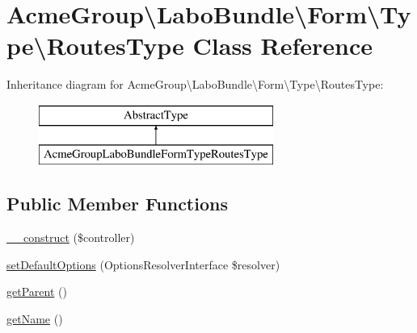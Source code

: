 \hypertarget{class_acme_group_1_1_labo_bundle_1_1_form_1_1_type_1_1_routes_type}{\section{Acme\+Group\textbackslash{}Labo\+Bundle\textbackslash{}Form\textbackslash{}Type\textbackslash{}Routes\+Type Class Reference}
\label{class_acme_group_1_1_labo_bundle_1_1_form_1_1_type_1_1_routes_type}
}
Inheritance diagram for Acme\+Group\textbackslash{}Labo\+Bundle\textbackslash{}Form\textbackslash{}Type\textbackslash{}Routes\+Type\+:\begin{figure}[H]
\begin{center}
\leavevmode
\includegraphics[height=2.000000cm]{class_acme_group_1_1_labo_bundle_1_1_form_1_1_type_1_1_routes_type}
\end{center}
\end{figure}
\subsection*{Public Member Functions}
\begin{DoxyCompactItemize}
\item 
\hyperlink{class_acme_group_1_1_labo_bundle_1_1_form_1_1_type_1_1_routes_type_a905761e58a698ebc680064c8cece0271}{\+\_\+\+\_\+construct} (\$controller)
\item 
\hyperlink{class_acme_group_1_1_labo_bundle_1_1_form_1_1_type_1_1_routes_type_a02294641d7349b132f5dfa48083f26e1}{set\+Default\+Options} (Options\+Resolver\+Interface \$resolver)
\item 
\hyperlink{class_acme_group_1_1_labo_bundle_1_1_form_1_1_type_1_1_routes_type_a7abdc8d9a4bb02ba09091042a8f61483}{get\+Parent} ()
\item 
\hyperlink{class_acme_group_1_1_labo_bundle_1_1_form_1_1_type_1_1_routes_type_a80dd71881cd4a60a1a9d282f974e725d}{get\+Name} ()
\end{DoxyCompactItemize}


